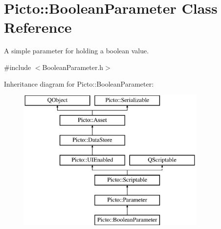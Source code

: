 \hypertarget{class_picto_1_1_boolean_parameter}{\section{Picto\-:\-:Boolean\-Parameter Class Reference}
\label{class_picto_1_1_boolean_parameter}
}


A simple parameter for holding a boolean value.  




{\ttfamily \#include $<$Boolean\-Parameter.\-h$>$}

Inheritance diagram for Picto\-:\-:Boolean\-Parameter\-:\begin{figure}[H]
\begin{center}
\leavevmode
\includegraphics[height=7.000000cm]{class_picto_1_1_boolean_parameter}
\end{center}
\end{figure}
